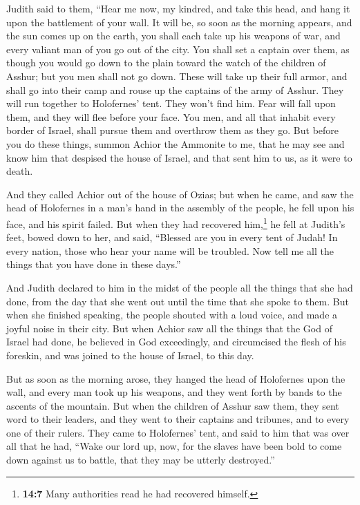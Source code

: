  Judith said to them, ``Hear me now, my kindred, and take
this head, and hang it upon the battlement of your wall. 
It will be, so soon as the morning appears, and the sun comes up on the
earth, you shall each take up his weapons of war, and every valiant man
of you go out of the city. You shall set a captain over them, as though
you would go down to the plain toward the watch of the children of
Asshur; but you men shall not go down.  These will take up
their full armor, and shall go into their camp and rouse up the captains
of the army of Asshur. They will run together to Holofernes' tent. They
won't find him. Fear will fall upon them, and they will flee before your
face.  You men, and all that inhabit every border of
Israel, shall pursue them and overthrow them as they go. 
But before you do these things, summon Achior the Ammonite to me, that
he may see and know him that despised the house of Israel, and that sent
him to us, as it were to death.

 And they called Achior out of the house of Ozias; but
when he came, and saw the head of Holofernes in a man's hand in the
assembly of the people, he fell upon his face, and his spirit failed.
 But when they had recovered him,\footnote{\textbf{14:7}
  Many authorities read he had recovered himself.} he fell at Judith's
feet, bowed down to her, and said, ``Blessed are you in every tent of
Judah! In every nation, those who hear your name will be troubled.
 Now tell me all the things that you have done in these
days.''

And Judith declared to him in the midst of the people all the things
that she had done, from the day that she went out until the time that
she spoke to them.  But when she finished speaking, the
people shouted with a loud voice, and made a joyful noise in their city.
 But when Achior saw all the things that the God of
Israel had done, he believed in God exceedingly, and circumcised the
flesh of his foreskin, and was joined to the house of Israel, to this
day.

 But as soon as the morning arose, they hanged the head
of Holofernes upon the wall, and every man took up his weapons, and they
went forth by bands to the ascents of the mountain.  But
when the children of Asshur saw them, they sent word to their leaders,
and they went to their captains and tribunes, and to every one of their
rulers.  They came to Holofernes' tent, and said to him
that was over all that he had, ``Wake our lord up, now, for the slaves
have been bold to come down against us to battle, that they may be
utterly destroyed.''

